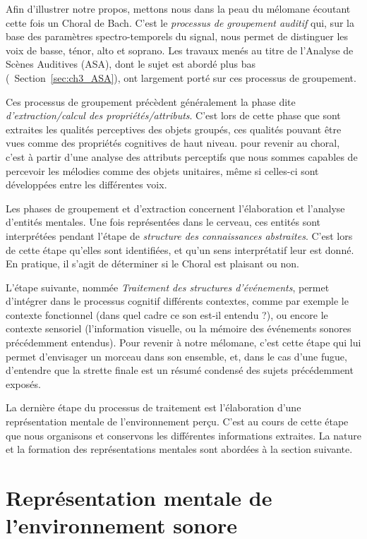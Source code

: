 Afin d'illustrer notre propos, mettons nous dans la peau du mélomane écoutant cette fois un Choral de Bach. C'est le \emph{processus de groupement auditif} qui, sur la base des paramètres spectro-temporels du signal, nous permet de distinguer les voix de basse, ténor, alto et soprano. Les travaux menés au titre de l'Analyse de Scènes Auditives (ASA), dont le sujet est abordé plus bas (\cf~Section~\ref{sec:ch3_ASA}), ont largement porté sur ces processus de groupement.

Ces processus de groupement précèdent généralement la phase dite \emph{d'extraction/calcul des propriétés/attributs}. C'est lors de cette phase que sont extraites les qualités perceptives des objets groupés, ces qualités pouvant être vues comme des propriétés cognitives de haut niveau. pour revenir au choral, c'est à partir d'une analyse des attributs perceptifs que nous sommes capables de percevoir les mélodies comme des objets unitaires, même si celles-ci sont développées entre les différentes voix.

Les phases de groupement et d'extraction concernent l'élaboration et l'analyse d'entités mentales. Une fois représentées dans le cerveau, ces entités sont interprétées pendant l'étape de \emph{structure des connaissances abstraites}. C'est lors de cette étape qu'elles sont identifiées, et qu'un sens interprétatif leur est donné. En pratique, il s'agit de déterminer si le Choral est plaisant ou non.

L'étape suivante, nommée \emph{Traitement des structures d'événements}, permet d'intégrer dans le processus cognitif différents contextes, comme par exemple le contexte fonctionnel (dans quel cadre ce son est-il entendu ?), ou encore le contexte sensoriel (l'information visuelle, ou la mémoire des événements sonores précédemment entendus). Pour revenir à notre mélomane, c'est cette étape qui lui permet d'envisager un morceau dans son ensemble, et, dans le cas d'une fugue, d'entendre que la strette finale est un résumé condensé des sujets précédemment exposés.

La dernière étape du processus de traitement est l'élaboration d'une représentation mentale de l'environnement perçu. C'est au cours de cette étape que nous organisons et conservons les différentes informations extraites. La nature et la formation des représentations mentales sont abordées à la section suivante.

\section{Représentation mentale de l'environnement sonore}
\label{sec:ch3_representationMentale}
 
